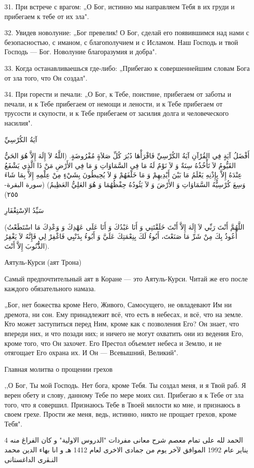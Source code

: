 \documentclass[a5paper]{article}
\begin{document}
31. При встрече с врагом: „О Бог, истинно мы направляем Тебя в их груди и прибегаем к тебе от их зла".

32. Увидев новолуние: „Бог превелик! О Бог, сделай его появившимся над нами с безопасностью, с иманом, с благополучием и с Исламом. Наш Господь и твой Господь — Бог. Новолуние благоразумия и добра".

33. Когда останавливаешься где-либо: „Прибегаю к совершеннейшим словам Бога от зла того, что Он создал".

34. При горести и печали: „О Бог, к Тебе, поистине, прибегаем от заботы и печали, и к Тебе прибегаем от немощи и лености, и к Тебе прибегаем от трусости и скупости, и к Тебе прибегаем от засилия долга и человеческого насилия".

آيَةُ الكُرْسِيِّ

أَفْضَلُ آيَةٍ فِي القُرْآنِ آيَةُ الكُرْسِيِّ فَاقْرَأْهَا دُبُرَ كُلِّ صَلاَةٍ مُفْرُوضَةٍ. (اللَّهُ لاَ إِلَهَ إِلاَّ هُوَ الحَيُّ القَيُّومُ لاَ تَأْخُذُهُ سِنَةٌ وَ لاَ نَوْمٌ لَهُ مَا فِي السَّمَاوَاتِ وَ مَا فِي الأَرْضِ مَنْ ذَا الَّذِي يَشْفَعُ عِنْدَهُ إِلاَّ بِإِذْنِهِ يَعْلَمُ مَا بَيْنَ أَيْدِيهِمْ وَ مَا خَلْفَهُمْ وَ لاَ يُحِيطُونَ بِشَيْءٍ مِنْ عِلْمِهِ إِلاَّ بِمَا شَاءَ وَسِعَ كُرْسِيُّهُ السَّمَاوَاتِ وَ الأَرْضَ وَ لاَ يَئُودُهُ حِفْظُهُمَا وَ هُوَ العَلِيُّ العَظِيمُ) (سورة البقرة- ٢٥٥)

سَيِّدُ الاِسْتِغْفَارِ

(اللَّهُمَّ أَنْتَ رَبِّي لاَ إِلَهَ إِلاَّ أَنْتَ خَلَقْتَنِي وَ أَنَا عَبْدُكَ وَ أَنَا عَلَى عَهْدِكَ وَ وَعْدِكَ مَا اسْتَطَعْتُ أَعُوذُ بِكَ مِنْ شَرِّ مَا صَنَعْتَ، أَبُوءُ لَكَ بِنِعْمَتِكَ عَلَيَّ وَ أَبُوءُ بِذَنْبِي فَاغْفِرْ لِي فَإِنَّهُ لاَ يَغْفِرُ الذُّّنُوبَ إِلاَّ أَنْتَ).

Аятуль-Курси (аят Трона)

Самый предпочтительный аят в Коране — это Аятуль-Курси. Читай же его после каждого обязательного намаза.

„Бог, нет божества кроме Него, Живого, Самосущего, не овладевают Им ни дремота, ни сон. Ему принадлежит всё, что есть в небесах, и всё, что на земле. Кто может заступиться перед Ним, кроме как с позволения Его? Он знает, что впереди них, и что позади них; и ничего не могут охватить они из ведения Его, кроме того, что Он захочет. Его Престол объемлет небеса и Землю, и не отягощает Его охрана их. И Он — Всевышний, Великий".

Главная молитва о прощении грехов

,,О Бог, Ты мой Господь. Нет бога, кроме Тебя. Ты создал меня, и я Твой раб. Я верен обету и слову, данному Тебе по мере моих сил. Прибегаю я к Тебе от зла того, что я совершил. Признаюсь Тебе в Твоей милости ко мне, и признаюсь в своем грехе. Прости же меня, ведь, истинно, никто не прощает грехов, кроме Тебя".

الحمد لله على تمام معصم شرح معانى مفردات "الدروس الاولية" و كان الفراغ منه 4 يناير عام 1992 الموافق لآخر يوم من جمادى الاخرى لعام 1412 هـ و انا بهاء الدين محمد النـﭭرى الداغستانى


\bigskip
\end{document}
